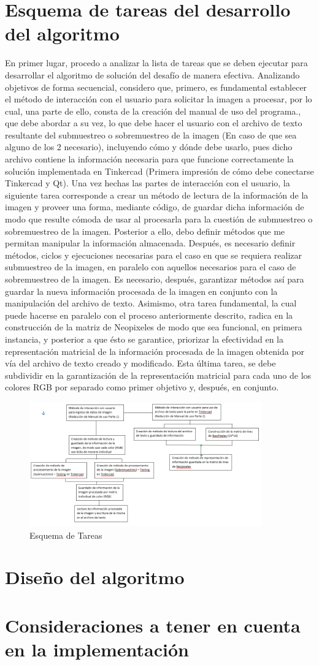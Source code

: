 \documentclass{article}
\begin{document}
 \section{Esquema de tareas del desarrollo del algoritmo}
 En primer lugar, procedo a analizar la lista de tareas que se deben ejecutar para desarrollar el algoritmo de solución del desafío de manera efectiva. Analizando objetivos de forma secuencial, considero que, primero, es fundamental establecer el método de interacción con el usuario para solicitar la imagen a procesar, por lo cual, una parte de ello, consta de la creación del manual de uso del programa., que debe abordar a su vez, lo que debe hacer el usuario con el archivo de texto resultante del submuestreo o sobremuestreo de la imagen (En caso de que sea alguno de los 2 necesario), incluyendo cómo y dónde debe usarlo, pues dicho archivo contiene la información necesaria para que funcione correctamente la solución implementada en Tinkercad (Primera impresión de cómo debe conectarse Tinkercad y Qt). Una vez hechas las partes de interacción con el usuario, la siguiente tarea corresponde a crear un método de lectura de la información de la imagen y proveer una forma, mediante código, de guardar dicha información de modo que resulte cómoda de usar al procesarla para la cuestión de submuestreo o sobremuestreo de la imagen. Posterior a ello, debo definir métodos que me permitan manipular la información almacenada. Después, es necesario definir métodos, ciclos y ejecuciones necesarias para el caso en que se requiera realizar submuestreo de la imagen, en paralelo con aquellos necesarios para el caso de sobremuestreo de la imagen. Es necesario, después, garantizar métodos así para guardar la nueva información procesada de la imagen en conjunto con la manipulación del archivo de texto. Asimismo, otra tarea fundamental, la cual puede hacerse en paralelo con el proceso anteriormente descrito, radica en la construcción de la matriz de Neopixeles de modo que sea funcional, en primera instancia, y posterior a que ésto se garantice, priorizar la efectividad en la representación matricial de la información procesada de la imagen obtenida por vía del archivo de texto creado y modificado. Esta última tarea, se debe subdividir en la garantización de la representación matricial para cada uno de los colores RGB por separado como primer objetivo y, después, en conjunto.
  \begin{figure}[h]
    \includegraphics[width=10cm]{Esquema_Tareas.png}
    \centering
    \caption{Esquema de Tareas}
    \label{fig:esquema_tareas}
 \end{figure}
 \section{Diseño del algoritmo}
 \section{Consideraciones a tener en cuenta en la implementación}


\end{document}
